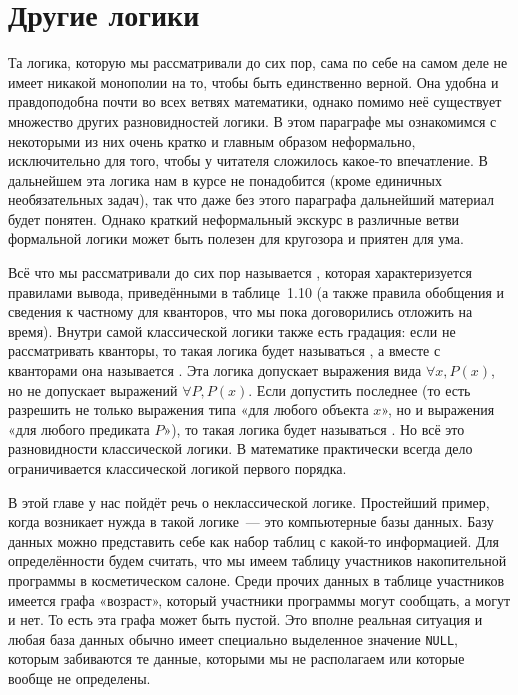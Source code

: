 \section{Другие логики}

Та логика, которую мы рассматривали до сих пор, сама по себе на самом деле не имеет никакой монополии на то, чтобы быть единственно верной. Она удобна и правдоподобна почти во всех ветвях математики, однако помимо неё существует множество других разновидностей логики. В этом параграфе мы ознакомимся с некоторыми из них очень кратко и главным образом неформально, исключительно для того, чтобы у читателя сложилось какое-то впечатление. В дальнейшем эта логика нам в курсе не понадобится (кроме единичных необязательных задач), так что даже без этого параграфа дальнейший материал будет понятен. Однако краткий неформальный экскурс в различные ветви формальной логики может быть полезен для кругозора и приятен для ума.

Всё что мы рассматривали до сих пор называется , которая характеризуется правилами вывода, приведёнными в таблице~1.10 (а также правила обобщения и сведения к частному для кванторов, что мы пока договорились отложить на время). Внутри самой классической логики также есть градация: если не рассматривать кванторы, то такая логика будет называться , а вместе с кванторами она называется . Эта логика допускает выражения вида $\forall x, P(x)$, но не допускает выражений $\forall P, P(x)$. Если допустить последнее (то есть разрешить не только выражения типа «для любого объекта $x$», но и выражения «для любого предиката $P$»), то такая логика будет называться . Но всё это разновидности классической логики. В математике практически всегда дело ограничивается классической логикой первого порядка.

В этой главе у нас пойдёт речь о неклассической логике. Простейший пример, когда возникает нужда в такой логике~— это компьютерные базы данных. Базу данных можно представить себе как набор таблиц с какой-то информацией. Для определённости будем считать, что мы имеем таблицу участников накопительной программы в косметическом салоне. Среди прочих данных в таблице участников имеется графа «возраст», который участники программы могут сообщать, а могут и нет. То есть эта графа может быть пустой. Это вполне реальная ситуация и любая база данных обычно имеет специально выделенное значение \texttt{NULL}, которым забиваются те данные, которыми мы не располагаем или которые вообще не определены.

